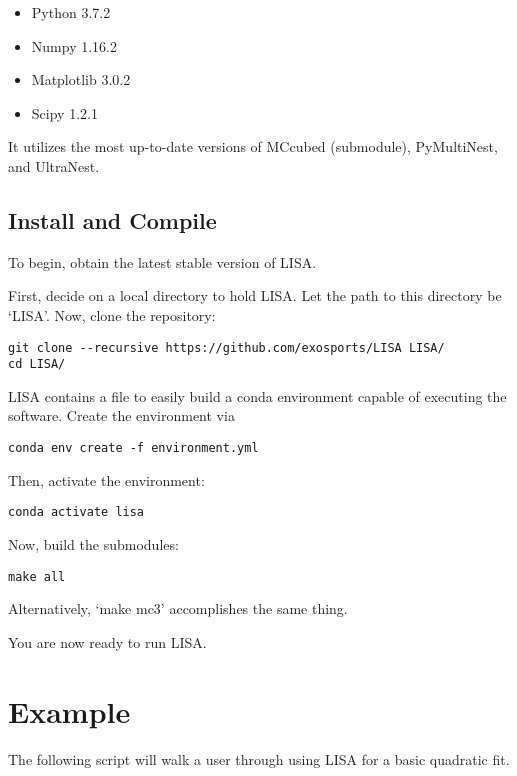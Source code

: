 \documentclass[letterpaper, 12pt]{article}
\begin{document}
\begin{itemize}
\item Python 3.7.2
\item Numpy 1.16.2
\item Matplotlib 3.0.2
\item Scipy 1.2.1
\end{itemize}

\noindent It utilizes the most up-to-date versions of MCcubed (submodule), 
PyMultiNest, and UltraNest.


\subsection{Install and Compile}
\label{sec:install}

\noindent To begin, obtain the latest stable version of LISA.  

\noindent First, decide on a local directory to hold LISA.  Let the path to this directory 
be `LISA'.  Now, clone the repository:
\begin{verbatim}
git clone --recursive https://github.com/exosports/LISA LISA/
cd LISA/
\end{verbatim}

\noindent LISA contains a file to easily build a conda environment capable of 
executing the software.  Create the environment via

\begin{verbatim}
conda env create -f environment.yml
\end{verbatim}

\noindent Then, activate the environment:

\begin{verbatim}
conda activate lisa
\end{verbatim}

\noindent Now, build the submodules:

\begin{verbatim}
make all
\end{verbatim}

\noindent Alternatively, `make mc3' accomplishes the same thing.

\noindent You are now ready to run LISA.


\section{Example}
\label{sec:example}

The following script will walk a user through using LISA for a basic quadratic 
fit.
\end{document}
